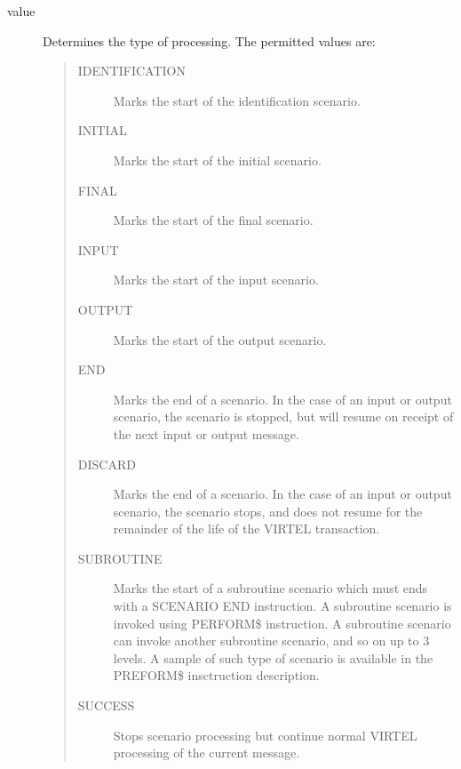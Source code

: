 \documentclass[letterpaper,10pt,english]{sphinxmanual}
\begin{document}
\begin{sphinxVerbatim}[commandchars=\\\{\}]
 
\end{sphinxVerbatim}
\begin{description}
\item[{value}] \leavevmode
Determines the type of processing. The permitted values are:
\begin{quote}
\begin{description}
\item[{IDENTIFICATION}] \leavevmode
Marks the start of the identification scenario.

\item[{INITIAL}] \leavevmode
Marks the start of the initial scenario.

\item[{FINAL}] \leavevmode
Marks the start of the final scenario.

\item[{INPUT}] \leavevmode
Marks the start of the input scenario.

\item[{OUTPUT}] \leavevmode
Marks the start of the output scenario.

\item[{END}] \leavevmode
Marks the end of a scenario. In the case of an input or output scenario, the scenario is stopped, but will resume on receipt of the next input or output message.

\item[{DISCARD}] \leavevmode
Marks the end of a scenario. In the case of an input or output scenario, the scenario stops, and does not resume for the remainder of the life of the VIRTEL transaction.

\item[{SUBROUTINE}] \leavevmode
Marks the start of a subroutine scenario which must ends with a SCENARIO END instruction. A subroutine scenario is invoked using PERFORM\$ instruction. A subroutine scenario can invoke another subroutine scenario, and so on up to 3 levels. A sample of such type of scenario is available in the PREFORM\$ insctruction description.

\item[{SUCCESS}] \leavevmode
Stops scenario processing but continue normal VIRTEL processing of the current message.

\end{description}
\end{quote}

\end{description}
\end{document}
